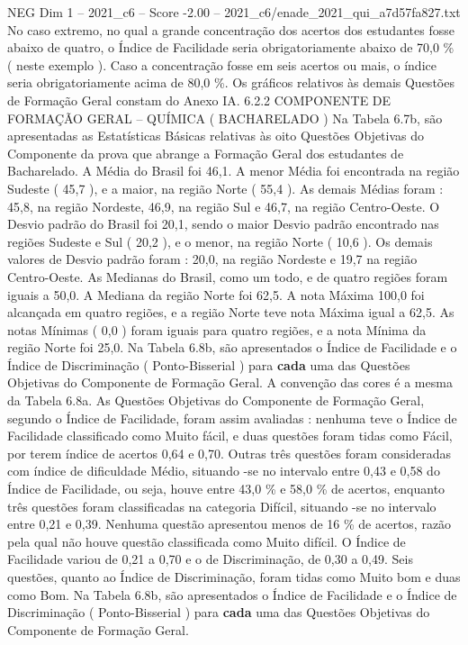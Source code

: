 \begin{textsample}{NEG Dim 1 – 2021\_c6 – Score -2.00 – 2021\_c6/enade\_2021\_qui\_a7d57fa827.txt}
No caso extremo, no qual a grande concentração dos acertos dos estudantes fosse abaixo de quatro, o Índice de Facilidade seria obrigatoriamente abaixo de 70,0 \% ( neste exemplo ).
Caso a concentração fosse em seis acertos ou mais, o índice seria obrigatoriamente acima de 80,0 \%.
Os gráficos relativos às demais Questões de Formação Geral constam do Anexo IA. 6.2.2 COMPONENTE DE FORMAÇÃO GERAL – QUÍMICA ( BACHARELADO ) Na Tabela 6.7b, são apresentadas as Estatísticas Básicas relativas às oito Questões Objetivas do Componente da prova que abrange a Formação Geral dos estudantes de Bacharelado.
A Média do Brasil foi 46,1.
A menor Média foi encontrada na região Sudeste ( 45,7 ), e a maior, na região Norte ( 55,4 ).
As demais Médias foram : 45,8, na região Nordeste, 46,9, na região Sul e 46,7, na região Centro-Oeste.
O Desvio padrão do Brasil foi 20,1, sendo o maior Desvio padrão encontrado nas regiões Sudeste e Sul ( 20,2 ), e o menor, na região Norte ( 10,6 ).
Os demais valores de Desvio padrão foram : 20,0, na região Nordeste e 19,7 na região Centro-Oeste.
As Medianas do Brasil, como um todo, e de quatro regiões foram iguais a 50,0.
A Mediana da região Norte foi 62,5.
A nota Máxima 100,0 foi alcançada em quatro regiões, e a região Norte teve nota Máxima igual a 62,5.
As notas Mínimas ( 0,0 ) foram iguais para quatro regiões, e a nota Mínima da região Norte foi 25,0.
Na Tabela 6.8b, são apresentados o Índice de Facilidade e o Índice de Discriminação ( Ponto-Bisserial ) para \textbf{cada} uma das Questões Objetivas do Componente de Formação Geral.
A convenção das cores é a mesma da Tabela 6.8a.
As Questões Objetivas do Componente de Formação Geral, segundo o Índice de Facilidade, foram assim avaliadas : nenhuma teve o Índice de Facilidade classificado como Muito fácil, e duas questões foram tidas como Fácil, por terem índice de acertos 0,64 e 0,70.
Outras três questões foram consideradas com índice de dificuldade Médio, situando -se no intervalo entre 0,43 e 0,58 do Índice de Facilidade, ou seja, houve entre 43,0 \% e 58,0 \% de acertos, enquanto três questões foram classificadas na categoria Difícil, situando -se no intervalo entre 0,21 e 0,39.
Nenhuma questão apresentou menos de 16 \% de acertos, razão pela qual não houve questão classificada como Muito difícil.
O Índice de Facilidade variou de 0,21 a 0,70 e o de Discriminação, de 0,30 a 0,49.
Seis questões, quanto ao Índice de Discriminação, foram tidas como Muito bom e duas como Bom.
Na Tabela 6.8b, são apresentados o Índice de Facilidade e o Índice de Discriminação ( Ponto-Bisserial ) para \textbf{cada} uma das Questões Objetivas do Componente de Formação Geral.

\end{textsample}
